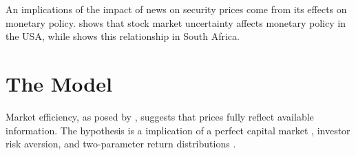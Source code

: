 \documentclass[a4paper]{article}
\begin{document}
An implications of the impact of news on security prices come from its effects on monetary policy. \citet{jovanoviczimmermann2010} shows that stock market uncertainty affects monetary policy in the USA, while \citet{naraidooraputsoane2015} shows this relationship in South Africa.







\begin{comment}
\cite{gabrielribeiro2013} LER METODOLOGIA, ACHO QUE PODE EXPICAR MELHOR A RELACAO ENTRE VOLATILIDADE ANORMAL E INEFICIENCIA
\citet{oprean2012} LER, FALA SOBRE TESTE DE EFICIENCIA
\end{comment}

\begin{comment}
\todo{Buscar outras citações, lembre do Mandelbrot e do Fama 1963 Journal of Busines})
As a consequence, \citet{pearce1987} states If the market is efficient there is no economic profit to be done with publicly available information, and investors should expect normal returns for the risk they bear, independent of the (publicly available) information they have access to.
Recent work on the effect of news on financial prices report a significant impact of those news on commondities and stock (\citet{larsenthorsrud2017} \citet{caporaleetal2015}).
Tests of market efficiency vary depending on the form of efficiency being tested. Tests for the weak form consist in testing if the historical prices follow a random walk (thus if they have a unit root). This is because, if current prices reflect historical prices, then there is no economic profit to be done with historical prices, so the best forecast for the price at the next period is always the current price, what defines the price as a random walk. Tests of weak form market efficiency include \citet{dongetal2013}, \citet{kamal2014}, and \citet{narayanetal2016}, which all reject weak form market efficiency.
\end{comment}


\section{The Model}


Market efficiency, as posed by \citet{fama1970}, suggests that prices fully reflect available information. The hypothesis is a implication of a perfect capital market , investor risk aversion, and two-parameter return distributions \citet{famamcbeth1973}.
\end{document}
